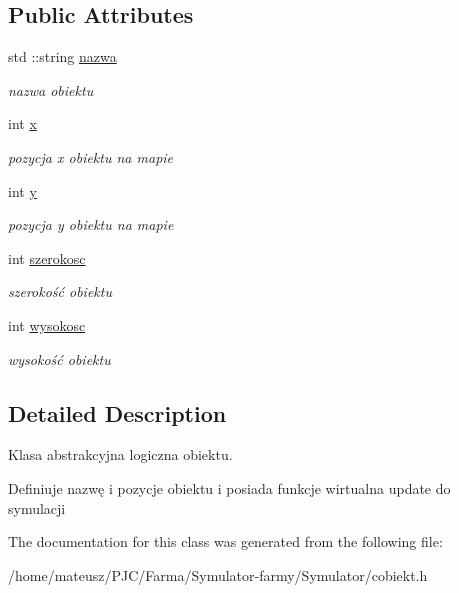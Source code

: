 \subsection*{Public Attributes}
\begin{DoxyCompactItemize}
\item 
\mbox{\label{class_c_obiekt_ac9ed13ef043c761cfb0f203a5732d75a}} 
std \+::string \mbox{\hyperlink{class_c_obiekt_ac9ed13ef043c761cfb0f203a5732d75a}{nazwa}}
\begin{DoxyCompactList}\small\item\em nazwa obiektu \end{DoxyCompactList}\item 
\mbox{\label{class_c_obiekt_a76de83c57d6539d180f228f5304bb543}} 
int \mbox{\hyperlink{class_c_obiekt_a76de83c57d6539d180f228f5304bb543}{x}}
\begin{DoxyCompactList}\small\item\em pozycja x obiektu na mapie \end{DoxyCompactList}\item 
\mbox{\label{class_c_obiekt_a468d7fd079cff08eaea0979c47f3b6a0}} 
int \mbox{\hyperlink{class_c_obiekt_a468d7fd079cff08eaea0979c47f3b6a0}{y}}
\begin{DoxyCompactList}\small\item\em pozycja y obiektu na mapie \end{DoxyCompactList}\item 
\mbox{\label{class_c_obiekt_a3b4cdd9bed92efca2156ce1e0078e76b}} 
int \mbox{\hyperlink{class_c_obiekt_a3b4cdd9bed92efca2156ce1e0078e76b}{szerokosc}}
\begin{DoxyCompactList}\small\item\em szerokość obiektu \end{DoxyCompactList}\item 
\mbox{\label{class_c_obiekt_a5c37ebf3252e0ec713e6e63eaba6fab8}} 
int \mbox{\hyperlink{class_c_obiekt_a5c37ebf3252e0ec713e6e63eaba6fab8}{wysokosc}}
\begin{DoxyCompactList}\small\item\em wysokość obiektu \end{DoxyCompactList}\end{DoxyCompactItemize}


\subsection{Detailed Description}
Klasa abstrakcyjna logiczna obiektu. 

Definiuje nazwę i pozycje obiektu i posiada funkcje wirtualna update do symulacji 

The documentation for this class was generated from the following file\+:\begin{DoxyCompactItemize}
\item 
/home/mateusz/\+P\+J\+C/\+Farma/\+Symulator-\/farmy/\+Symulator/cobiekt.\+h\end{DoxyCompactItemize}
